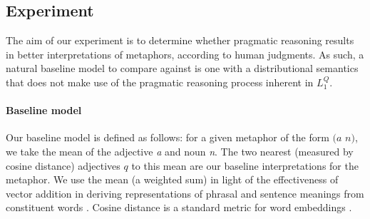 \documentclass[9pt,twocolumn,twoside,lineno]{pnas-new}
\newcommand{\Listener}{L}
\newcommand{\QLONE}{\Listener_{{1}}^{{Q}}}
\begin{document}
{%



\subsection*{Experiment}

		The aim of our experiment is to determine whether pragmatic reasoning results in better interpretations of metaphors, according to human judgments. As such, a natural baseline model to compare against is one with a distributional semantics that does not make use of the pragmatic reasoning process inherent in $\QLONE$.

		\paragraph{Baseline model}
		Our baseline model is defined as follows: for a given metaphor of the form $(a$ $n)$, we take the mean of the adjective \emph{a} and noun \emph{n}. The two nearest (measured by cosine distance) adjectives $q$ to this mean are our baseline interpretations for the metaphor. We use the mean (a weighted sum) in light of the effectiveness of vector addition in deriving representations of phrasal and sentence meanings from constituent words \cite{mitchell2010composition,grefenstette2013category,socher2013recursive}. Cosine distance is a standard metric for word embeddings \cite{pennington2014glove}.



			





}
\end{document}
